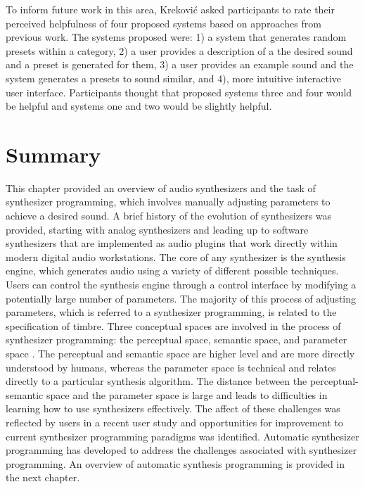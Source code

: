 To inform future work in this area, Krekovi\'{c} asked participants to rate their perceived helpfulness of four proposed systems based on approaches from previous work. The systems proposed were: 1) a system that generates random presets within a category, 2) a user provides a description of a the desired sound and a preset is generated for them, 3) a user provides an example sound and the system generates a presets to sound similar, and 4), more intuitive interactive user interface. Participants thought that proposed systems three and four would be helpful and systems one and two would be slightly helpful.

\section{Summary}
This chapter provided an overview of audio synthesizers and the task of synthesizer programming, which involves manually adjusting parameters to achieve a desired sound. A brief history of the evolution of synthesizers was provided, starting with analog synthesizers and leading up to software synthesizers that are implemented as audio plugins that work directly within modern digital audio workstations. The core of any synthesizer is the synthesis engine, which generates audio using a variety of different possible techniques. Users can control the synthesis engine through a control interface by modifying a potentially large number of parameters. The majority of this process of adjusting parameters, which is referred to a synthesizer programming, is related to the specification of timbre. Three conceptual spaces are involved in the process of synthesizer programming: the perceptual space, semantic space, and parameter space \cite{pardo2019learning}. The perceptual and semantic space are higher level and are more directly understood by humans, whereas the parameter space is technical and relates directly to a particular synthesis algorithm. The distance between the perceptual-semantic space and the parameter space is large and leads to difficulties in learning how to use synthesizers effectively. The affect of these challenges was reflected by users in a recent user study \cite{krekovic2019insights} and opportunities for improvement to current synthesizer programming paradigms was identified. Automatic synthesizer programming has developed to address the challenges associated with synthesizer programming. An overview of automatic synthesis programming is provided in the next chapter.